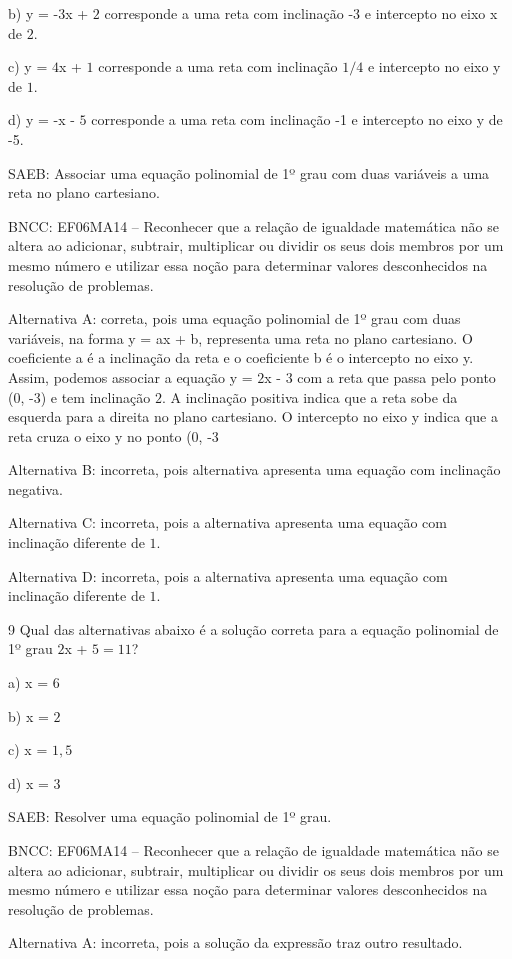 b) y = -3x + $2$ corresponde a uma reta com inclinação -3 e intercepto no
eixo x de $2$.

c) y = $4$x + $1$ corresponde a uma reta com inclinação $1/4$ e intercepto no
eixo y de $1$.

d) y = -x - $5$ corresponde a uma reta com inclinação -1 e intercepto no
eixo y de -5.

SAEB: Associar uma equação polinomial de 1º grau com duas variáveis a
uma reta no plano cartesiano.

BNCC: EF06MA14 -- Reconhecer que a relação de igualdade matemática não
se altera ao adicionar, subtrair, multiplicar ou dividir os seus dois
membros por um mesmo número e utilizar essa noção para determinar
valores desconhecidos na resolução de problemas.

Alternativa A: correta, pois uma equação polinomial de 1º grau com duas
variáveis, na forma y = ax + b, representa uma reta no plano cartesiano.
O coeficiente a é a inclinação da reta e o coeficiente b é o intercepto
no eixo y. Assim, podemos associar a equação y = $2$x - $3$ com a reta que
passa pelo ponto (0, -3) e tem inclinação $2$. A inclinação positiva
indica que a reta sobe da esquerda para a direita no plano cartesiano. O
intercepto no eixo y indica que a reta cruza o eixo y no ponto (0, -3

Alternativa B: incorreta, pois alternativa apresenta uma equação com
inclinação negativa.

Alternativa C: incorreta, pois a alternativa apresenta uma equação com
inclinação diferente de $1$.

Alternativa D: incorreta, pois a alternativa apresenta uma equação com
inclinação diferente de $1$.

\num{9}  Qual das alternativas abaixo é a solução correta para a equação
polinomial de 1º grau $2$x + $5 = 11$?

a) x = $6$

b) x = $2$

c) x = $1,5$

d) x = $3$

SAEB: Resolver uma equação polinomial de 1º grau.

BNCC: EF06MA14 -- Reconhecer que a relação de igualdade matemática não
se altera ao adicionar, subtrair, multiplicar ou dividir os seus dois
membros por um mesmo número e utilizar essa noção para determinar
valores desconhecidos na resolução de problemas.

Alternativa A: incorreta, pois a solução da expressão traz outro
resultado.

